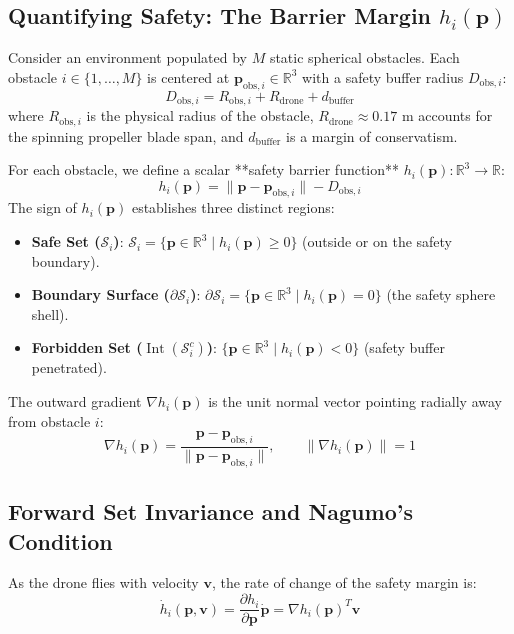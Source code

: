 \documentclass[11pt,a4paper]{article}
\begin{document}
\subsection{Quantifying Safety: The Barrier Margin \texorpdfstring{$h_i(\mathbf{p})$}{hi(p)}}
Consider an environment populated by $M$ static spherical obstacles. Each obstacle $i \in \{1, \dots, M\}$ is centered at $\mathbf{p}_{\mathrm{obs}, i} \in \mathbb{R}^3$ with a safety buffer radius $D_{\mathrm{obs}, i}$:
\begin{equation}
D_{\mathrm{obs}, i} = R_{\mathrm{obs}, i} + R_{\mathrm{drone}} + d_{\mathrm{buffer}}
\end{equation}
where $R_{\mathrm{obs}, i}$ is the physical radius of the obstacle, $R_{\mathrm{drone}} \approx 0.17\text{ m}$ accounts for the spinning propeller blade span, and $d_{\mathrm{buffer}}$ is a margin of conservatism.

For each obstacle, we define a scalar **safety barrier function** $h_i(\mathbf{p}): \mathbb{R}^3 \to \mathbb{R}$:
\begin{equation}
h_i(\mathbf{p}) = \|\mathbf{p} - \mathbf{p}_{\mathrm{obs}, i}\| - D_{\mathrm{obs}, i}
\label{eq:barrier_func}
\end{equation}
The sign of $h_i(\mathbf{p})$ establishes three distinct regions:
\begin{itemize}
    \item \textbf{Safe Set ($\mathcal{S}_i$)}: $\mathcal{S}_i = \{\mathbf{p} \in \mathbb{R}^3 \mid h_i(\mathbf{p}) \ge 0\}$ (outside or on the safety boundary).
    \item \textbf{Boundary Surface ($\partial \mathcal{S}_i$)}: $\partial\mathcal{S}_i = \{\mathbf{p} \in \mathbb{R}^3 \mid h_i(\mathbf{p}) = 0\}$ (the safety sphere shell).
    \item \textbf{Forbidden Set ($\operatorname{Int}(\mathcal{S}_i^c)$)}: $\{\mathbf{p} \in \mathbb{R}^3 \mid h_i(\mathbf{p}) < 0\}$ (safety buffer penetrated).
\end{itemize}

The outward gradient $\nabla h_i(\mathbf{p})$ is the unit normal vector pointing radially away from obstacle $i$:
\begin{equation}
\nabla h_i(\mathbf{p}) = \frac{\mathbf{p} - \mathbf{p}_{\mathrm{obs}, i}}{\|\mathbf{p} - \mathbf{p}_{\mathrm{obs}, i}\|}, \qquad \|\nabla h_i(\mathbf{p})\| = 1
\label{eq:cbf_gradient}
\end{equation}

\subsection{Forward Set Invariance and Nagumo's Condition}
As the drone flies with velocity $\mathbf{v}$, the rate of change of the safety margin is:
\begin{equation}
\dot{h}_i(\mathbf{p}, \mathbf{v}) = \frac{\partial h_i}{\partial \mathbf{p}} \mathbf{\dot{p}} = \nabla h_i(\mathbf{p})^T \mathbf{v}
\end{equation}
\end{document}
